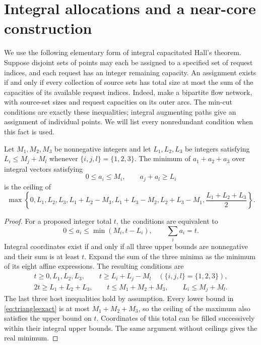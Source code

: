 \section{Integral allocations and a near-core construction}\label{app:allocation}
We use the following elementary form of integral capacitated Hall's
theorem. Suppose disjoint sets of points may each be assigned to a
specified set of request indices, and each request has an integer
remaining capacity. An assignment exists if and only if every collection
of source sets has total size at most the sum of the capacities of its
available request indices. Indeed, make a bipartite flow network, with
source-set sizes and request capacities on its outer arcs. The min-cut
conditions are exactly these inequalities; integral augmenting paths
give an assignment of individual points. We will list every nonredundant
condition when this fact is used.

\begin{lemma}\label{lem:triangle}
Let $M_1,M_2,M_3$ be nonnegative integers and let $L_1,L_2,L_3$ be
integers satisfying $L_i\le M_j+M_l$ whenever $\{i,j,l\}=\{1,2,3\}$.
The minimum of $a_1+a_2+a_3$ over integral vectors satisfying
\[
 0\le a_i\le M_i,\qquad a_j+a_l\ge L_i
\]
is the ceiling of
\begin{equation}\label{eq:triangleexact}
 \max\left\{0,L_1,L_2,L_3,
 L_1+L_2-M_3,L_1+L_3-M_2,L_2+L_3-M_1,
 \frac{L_1+L_2+L_3}{2}\right\}.
\end{equation}
\end{lemma}
\begin{proof}
For a proposed integer total $t$, the conditions are equivalent to
\[
 0\le a_i\le\min(M_i,t-L_i),\qquad \sum_i a_i=t.
\]
Integral coordinates exist if and only if all three upper bounds are
nonnegative and their sum is at least $t$. Expand the sum of the three
minima as the minimum of its eight affine expressions. The resulting
conditions are
\begin{gather*}
 t\ge0,L_1,L_2,L_3,\qquad
 t\ge L_i+L_j-M_l\quad(\{i,j,l\}=\{1,2,3\}),\\
 2t\ge L_1+L_2+L_3,\qquad t\le M_1+M_2+M_3,\qquad
 L_i\le M_j+M_l.
\end{gather*}
The last three host inequalities hold by assumption. Every lower bound
in \eqref{eq:triangleexact} is at most $M_1+M_2+M_3$, so the ceiling of
the maximum also satisfies the upper bound on $t$. Coordinates of this
total can be filled successively within their integral upper bounds.
The same argument without ceilings gives the real minimum.
\end{proof}

